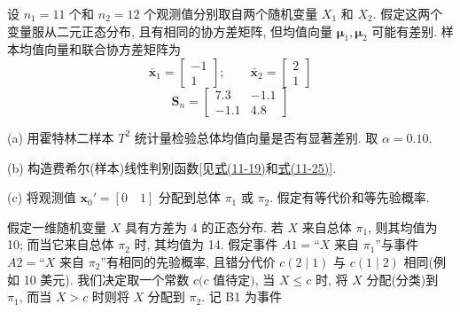 \quad 设 $n_1=11$ 个和 $n_2=12$ 个观测值分别取自两个随机变量 $X_1$ 和 $X_2$. 假定这两个变量服从二元正态分布, 且有相同的协方差矩阵, 但均值向量 $\boldsymbol{\mu}_1,\boldsymbol{\mu}_2$ 可能有差别. 样本均值向量和联合协方差矩阵为
\[
\bar{\mathbf{x}}_1=\begin{bmatrix}-1\\1\end{bmatrix};\qquad \bar{\mathbf{x}}_2=\begin{bmatrix}2\\1\end{bmatrix}
\]
\[
\mathbf{S}_n=\begin{bmatrix}7.3&-1.1\\-1.1&4.8\end{bmatrix}
\]

(a) 用霍特林二样本 $T^2$ 统计量检验总体均值向量是否有显著差别. 取 $\alpha=0.10$.

(b) 构造费希尔(样本)线性判别函数[见\hyperref[eq:11-19]{式(11-19)}和\hyperref[eq:11-25]{式(11-25)}].

(c) 将观测值 $\mathbf{x}_0'=[0\quad 1]$ 分配到总体 $\pi_1$ 或 $\pi_2$. 假定有等代价和等先验概率.

\quad 假定一维随机变量 $X$ 具有方差为 4 的正态分布. 若 $X$ 来自总体 $\pi_1$, 则其均值为 10; 而当它来自总体 $\pi_2$ 时, 其均值为 14. 假定事件 $A1=$“$X$ 来自 $\pi_1$”与事件 $A2=$“$X$ 来自 $\pi_2$”有相同的先验概率, 且错分代价 $c(2\mid 1)$ 与 $c(1\mid 2)$ 相同(例如 10 美元). 我们决定取一个常数 $c(c$ 值待定$)$, 当 $X\le c$ 时, 将 $X$ 分配(分类)到 $\pi_1$, 而当 $X>c$ 时则将 $X$ 分配到 $\pi_2$. 记 B1 为事件
